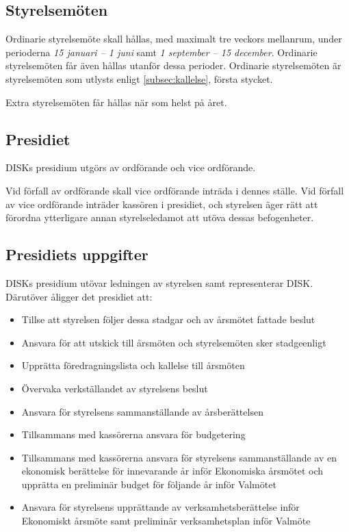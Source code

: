         \subsection{Styrelsemöten}
        \label{subsec:styrelsemoten}
                Ordinarie styrelsemöte skall hållas, med maximalt tre veckors mellanrum, under perioderna \emph{15 januari – 1 juni} samt \emph{1 september – 15 december}. Ordinarie styrelsemöten får även hållas utanför dessa perioder. Ordinarie styrelsemöten är styrelsemöten som utlysts enligt \ref{subsec:kallelse}, första stycket.\par
                Extra styrelsemöten får hållas när som helst på året.

        \subsection{Presidiet}
        \label{subsec:presidiet}
                DISKs presidium utgörs av ordförande och vice ordförande.\par
                Vid förfall av ordförande skall vice ordförande inträda i dennes ställe. Vid förfall av vice ordförande inträder kassören i presidiet, och styrelsen äger rätt att förordna ytterligare annan styrelseledamot att utöva dessas befogenheter.

        \subsection{Presidiets uppgifter}
        \label{subsec:presidietsuppgifter}
                DISKs presidium utövar ledningen av styrelsen samt representerar DISK. Därutöver åligger det presidiet att:
                \begin{itemize}
                \setlength{\itemsep}{0.0cm}
                \setlength{\parskip}{0.0cm}
                        \item Tillse att styrelsen följer dessa stadgar och av årsmötet fattade beslut
                        \item Ansvara för att utskick till årsmöten och styrelsemöten sker stadgeenligt
                        \item Upprätta föredragningslista och kallelse till årsmöten
                        \item Övervaka verkställandet av styrelsens beslut
                        \item Ansvara för styrelsens sammanställande av årsberättelsen
                        \item Tillsammans med kassörerna ansvara för budgetering
                        \item Tillsammans med kassörerna ansvara för styrelsens sammanställande av en ekonomisk berättelse för innevarande år inför Ekonomiska årsmötet och upprätta en preliminär budget för följande år inför Valmötet
                        \item Ansvara för styrelsens upprättande av verksamhetsberättelse inför Ekonomiskt årsmöte samt preliminär verksamhetsplan inför Valmöte
                \end{itemize}

